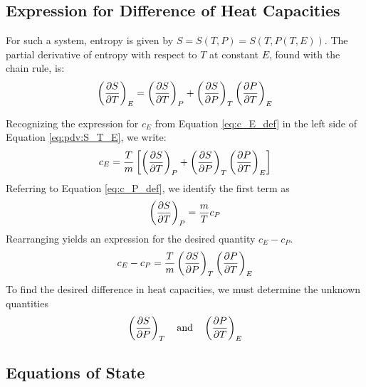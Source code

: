 \documentclass[11pt, a4paper]{article}
\begin{document}
\subsection*{Expression for Difference of Heat Capacities}
For such a system, entropy is given by $  S = S(T, P) = S(T, P(T, E)) $. The partial derivative of entropy with respect to $ T $ at constant $ E $, found with the chain rule, is:
\begin{equation}
	\left(\pdv{S}{T}\right)_E  =  \left(\pdv{S}{T}\right)_P +  \left(\pdv{S}{P}\right)_T  \left(\pdv{P}{T}\right)_E \label{eq:pdv:S_T_E}
\end{equation}


Recognizing the expression for $ c_E $ from Equation \ref{eq:c_E_def} in the left side of Equation \ref{eq:pdv:S_T_E}, we write:
\begin{align*}
	c_E = \frac{T}{m} \left[ \left(\pdv{S}{T}\right)_P +  \left(\pdv{S}{P}\right)_T  \left(\pdv{P}{T}\right)_E \right]
\end{align*}
Referring to Equation \ref{eq:c_P_def}, we identify the first term as
\begin{equation*}
	\left(\pdv{S}{T}\right)_P = \frac{m}{T} c_P
\end{equation*}
Rearranging yields an expression for the desired quantity $ c_E - c_P $.
\begin{equation}
	c_E - c_P = \frac{T}{m} \left(\pdv{S}{P}\right)_T  \left(\pdv{P}{T}\right)_E \label{eq:diff_cE_cP}
\end{equation}
To find the desired difference in heat capacities, we must determine the unknown quantities
\begin{equation*}
	\left(\pdv{S}{P}\right)_T \quad \text{and} \quad \left(\pdv{P}{T}\right)_E
\end{equation*}

\subsection*{Equations of State}
\end{document}
